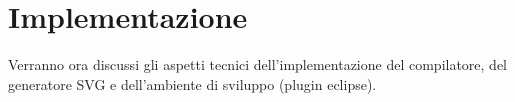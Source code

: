 \chapter{Implementazione}

Verranno ora discussi gli aspetti tecnici dell'implementazione del compilatore,
del generatore SVG e dell'ambiente di sviluppo (plugin eclipse).
